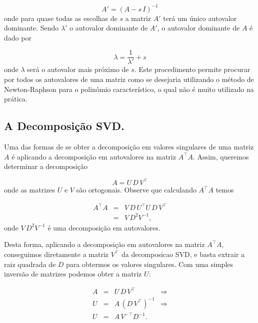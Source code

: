 \begin{equation*}
A'=(A-s\,I)^{-1}
\end{equation*}
onde para quase todas as escolhas de $s$ a matriz $A'$ terá um único autovalor dominante. Sendo $\lambda'$ o autovalor dominante de $A'$, o autovalor dominante de $A$ é dado por

\begin{equation*}
\lambda=\frac{1}{\lambda'}+s
\end{equation*} 
onde $\lambda$ será o autovalor mais próximo de $s$. Este procedimento permite procurar por todos os autovalores de uma matriz como se desejaria utilizando o método de Newton-Raphson para o polinômio característico, o qual não é muito utilizado na prática.

\subsection{A Decomposição SVD.}
Uma das formas de se obter a decomposição em valores singulares de uma matriz $A$ é aplicando a decomposição em autovalores na matriz  $A^\top A$. Assim, queremos determinar a decomposição

\begin{equation}
A=U\,D\,V^\top
\end{equation} 
onde as matrizes $U$ e $V$ são ortogonais. Observe que calculando $A^\top A$ temos

\begin{equation}
\begin{array}{rcl}
A^\top A&=&V\,D\,U^\top U\,D\,V^\top\\
&=&V\,D^2 V^{-1},
\end{array}
\end{equation}
onde $V\,D^2 V^{-1}$ é uma decomposição em autovalores.

Desta forma, aplicando a decomposição em autovalores na matriz $A^\top A$, conseguimos diretamente a matriz $V^\top$ da decomposicao SVD, e basta extrair a raiz quadrada de $D$ para obtermos os valores singulares. Com uma simples inversão de matrizes podemos obter a matriz $U$:

\begin{equation}
\begin{array}{rcll}
A&=&U\,D\,V^\top &\Rightarrow\\
U&=&A\,(D\,V^\top)^{-1} &\Rightarrow\\
U&=&A\,V^{-\top}D^{-1}.
\end{array}
\end{equation}

